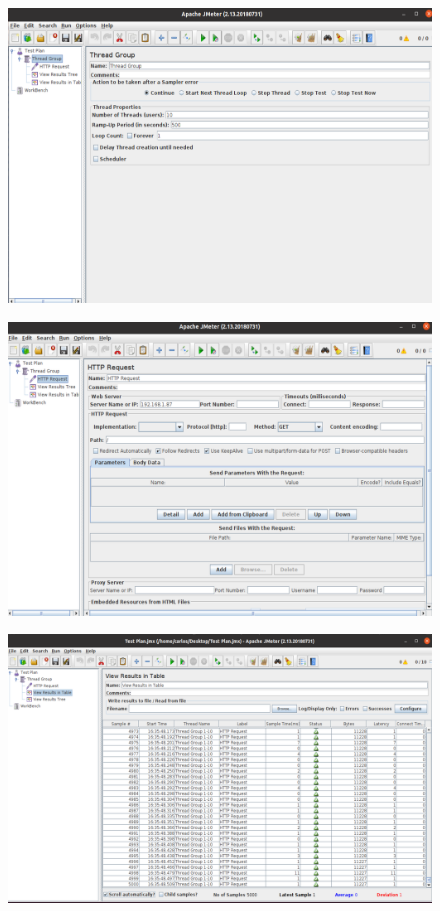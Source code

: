 \documentclass{article}
\begin{document}
	\begin{figure}[!htb]
		\centering
		\includegraphics[scale=0.6]{tp_sosd_c1}
	\end{figure}

	\newpage
	
	\begin{figure}[!htb]
		\centering
		\includegraphics[scale=0.6]{tp_sosd_c2}
	\end{figure}
	\newpage
	
	\begin{figure}[!htb]
	\centering
	\includegraphics[scale=0.5]{tp_sosd_c3}
	\end{figure}
\end{document}
